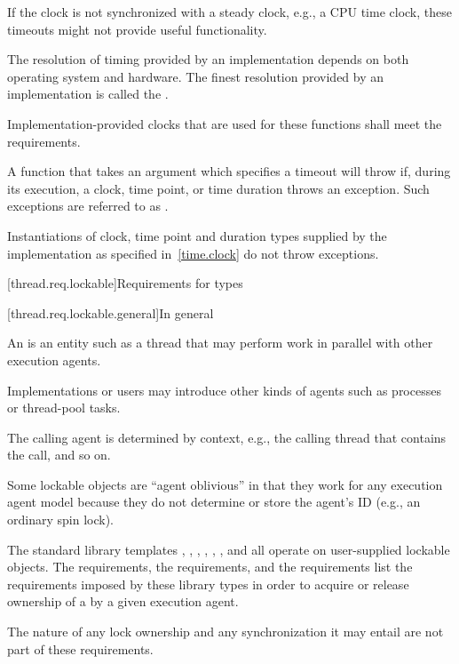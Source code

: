 \pnum
\begin{note}
If the clock is not synchronized with a steady clock, e.g., a CPU time clock, these
timeouts might not provide useful functionality.
\end{note}

\pnum
The resolution of timing provided by an implementation depends on both operating system
and hardware. The finest resolution provided by an implementation is called the
.

\pnum
Implementation-provided clocks that are used for these functions shall meet the
 requirements.

\pnum
A function that takes an argument which specifies a timeout will throw if,
during its execution, a clock, time point, or time duration throws an exception.
Such exceptions are referred to as .
\begin{note}
Instantiations of clock, time point and duration types supplied by
the implementation as specified in~\ref{time.clock} do not throw exceptions.
\end{note}

[thread.req.lockable]{Requirements for  types}

[thread.req.lockable.general]{In general}

\pnum
An  is an entity such as a thread that may perform work in parallel with
other execution agents.
\begin{note}
Implementations or users may introduce other kinds of
agents such as processes or thread-pool tasks.
\end{note}
The calling agent is determined by
context, e.g., the calling thread that contains the call, and so on.

\pnum
\begin{note}
Some lockable objects are ``agent oblivious'' in that they work for any
execution agent model because they do not determine or store the agent's ID (e.g., an
ordinary spin lock).
\end{note}

\pnum
The standard library templates ,
,
,
, ,
, and
 all operate on user-supplied
lockable objects. The  requirements, the  requirements,
and the  requirements list the requirements imposed by these library types
in order to acquire or release ownership of a  by a given execution agent.
\begin{note}
The nature of any lock ownership and any synchronization it may entail are not part
of these requirements.
\end{note}

